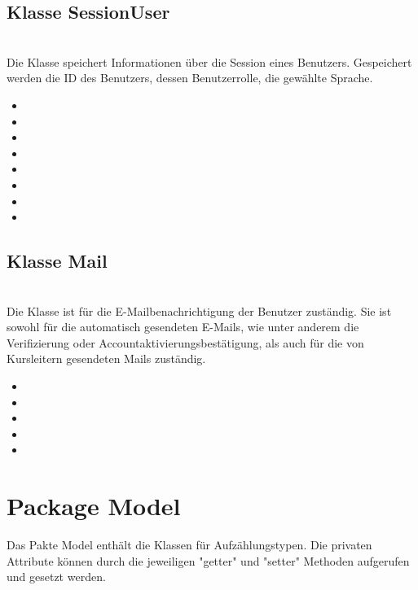 	\subsection{Klasse SessionUser}
	\\
	Die Klasse speichert Informationen über die Session eines Benutzers. Gespeichert werden die ID des Benutzers, dessen Benutzerrolle, die gewählte Sprache.
	\begin{itemize}
		\item {}
		\item {}
		\item {}
		\item {}
		\item {}
		\item {}
		\item {}
		\item {}
	\end{itemize}
	
	\subsection{Klasse Mail}
	\\
	Die Klasse ist für die E-Mailbenachrichtigung der Benutzer zuständig. Sie ist sowohl für die automatisch gesendeten E-Mails, wie unter anderem die Verifizierung oder Accountaktivierungsbestätigung, als auch für die von Kursleitern gesendeten Mails zuständig.
	\begin{itemize}
		\item {}
		\item {}
		\item {}
		\item {}
		\item {}
	\end{itemize}
	
	\section{Package Model}
	Das Pakte Model enthält die Klassen für Aufzählungstypen. Die privaten Attribute können durch die jeweiligen "getter" und "setter" Methoden aufgerufen und gesetzt werden.
